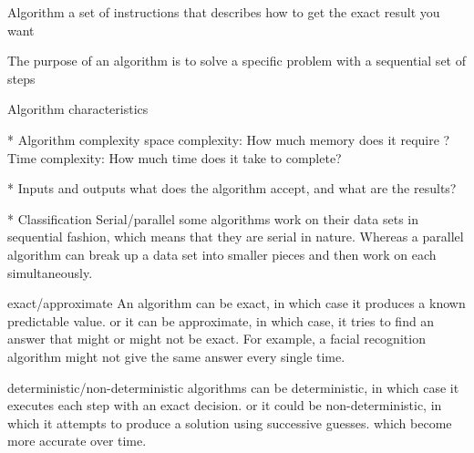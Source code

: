 Algorithm 
  a set of instructions that describes how to get the exact result you want

The purpose of an algorithm is 
  to solve a specific problem with a sequential set of steps

Algorithm  characteristics 

* Algorithm complexity 
    space complexity: How much memory does it require ?
    Time complexity: How much time does it take to complete?


* Inputs and outputs 
    what does the algorithm accept, and what are the results?


* Classification
    Serial/parallel
        some algorithms work on their data sets in sequential fashion, which means that they are serial in nature. 
        Whereas a parallel algorithm can break up a data set into smaller pieces and then work on each simultaneously.

    exact/approximate
        An algorithm can be exact, in which case it produces a known predictable value.
        or it can be approximate, in which case, it tries to find an answer that might or might not be exact. 
        For example, a facial recognition algorithm might not give the same answer every single time. 

    deterministic/non-deterministic 
        algorithms can be deterministic, in which case it executes each step with an exact decision.
        or it could be non-deterministic, in which it attempts to produce a solution using successive guesses.
         which become more accurate over time.

